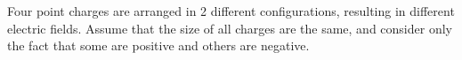 \documentclass[12pt]{exam}
\begin{document}
\begin{questions}
\question Four point charges are arranged in 2 different configurations, resulting in different electric fields. Assume that the size of all charges are the same, and consider only the fact that some are positive and others are negative.

\end{questions}
\end{document}
